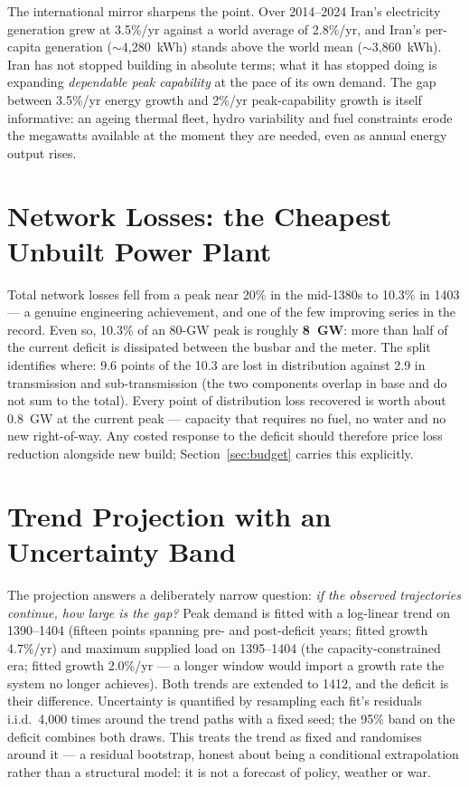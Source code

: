 \documentclass[conference]{IEEEtran}
\begin{document}
The international mirror sharpens the point. Over 2014--2024 Iran's electricity generation grew at 3.5\%/yr against a world average of 2.8\%/yr, and Iran's per-capita generation ($\sim$4{,}280~kWh) stands above the world mean ($\sim$3{,}860~kWh). Iran has not stopped building in absolute terms; what it has stopped doing is expanding \emph{dependable peak capability} at the pace of its own demand. The gap between 3.5\%/yr energy growth and 2\%/yr peak-capability growth is itself informative: an ageing thermal fleet, hydro variability and fuel constraints erode the megawatts available at the moment they are needed, even as annual energy output rises.

\section{Network Losses: the Cheapest Unbuilt Power Plant}
\label{sec:losses}
Total network losses fell from a peak near 20\% in the mid-1380s to 10.3\% in 1403 --- a genuine engineering achievement, and one of the few improving series in the record. Even so, 10.3\% of an 80-GW peak is roughly \textbf{8~GW}: more than half of the current deficit is dissipated between the busbar and the meter. The split identifies where: 9.6 points of the 10.3 are lost in distribution against 2.9 in transmission and sub-transmission (the two components overlap in base and do not sum to the total). Every point of distribution loss recovered is worth about 0.8~GW at the current peak --- capacity that requires no fuel, no water and no new right-of-way. Any costed response to the deficit should therefore price loss reduction alongside new build; Section~\ref{sec:budget} carries this explicitly.

\section{Trend Projection with an Uncertainty Band}
\label{sec:projection}
The projection answers a deliberately narrow question: \emph{if the observed trajectories continue, how large is the gap?} Peak demand is fitted with a log-linear trend on 1390--1404 (fifteen points spanning pre- and post-deficit years; fitted growth 4.7\%/yr) and maximum supplied load on 1395--1404 (the capacity-constrained era; fitted growth 2.0\%/yr --- a longer window would import a growth rate the system no longer achieves). Both trends are extended to 1412, and the deficit is their difference. Uncertainty is quantified by resampling each fit's residuals i.i.d.\ 4{,}000 times around the trend paths with a fixed seed; the 95\% band on the deficit combines both draws. This treats the trend as fixed and randomises around it --- a residual bootstrap, honest about being a conditional extrapolation rather than a structural model: it is not a forecast of policy, weather or war.
\end{document}
